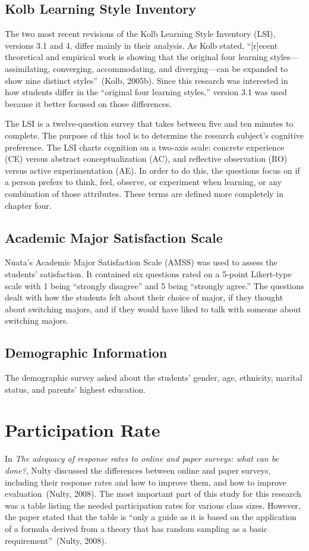 \subsection{Kolb Learning Style Inventory}
The two most recent revisions of the Kolb Learning Style Inventory (LSI), versions 3.1 and 4, differ mainly in their analysis. As Kolb stated, ``[r]ecent theoretical and empirical work is showing that the original four learning styles—assimilating, converging, accommodating, and diverging—can be expanded to show nine distinct styles''~(Kolb, 2005b). Since this research was interested in how students differ in the ``original four learning styles,'' version 3.1 was used because it better focused on those differences.

The LSI is a twelve-question survey that takes between five and ten minutes to complete. The purpose of this tool is to determine the research subject's cognitive preference. The LSI charts cognition on a two-axis scale: concrete experience (CE) versus abstract conceptualization (AC), and reflective observation (RO) versus active experimentation (AE). In order to do this, the questions focus on if a person prefers to think, feel, observe, or experiment when learning, or any combination of those attributes. These terms are defined more completely in chapter four.

\subsection{Academic Major Satisfaction Scale}
Nuata's Academic Major Satisfaction Scale (AMSS) was used to assess the students' satisfaction. It contained six questions rated on a 5-point Likert-type scale with 1 being ``strongly disagree'' and 5 being ``strongly agree.'' The questions dealt with how the students felt about their choice of major, if they thought about switching majors, and if they would have liked to talk with someone about switching majors.

\subsection{Demographic Information}
The demographic survey asked about the students' gender, age, ethnicity, marital status, and parents' highest education.

\section{Participation Rate}
In \textit{The adequacy of response rates to online and paper surveys: what can be done?}, Nulty discussed the differences between online and paper surveys, including their response rates and how to improve them, and how to improve evaluation~(Nulty, 2008). The most important part of this study for this research was a table listing the needed participation rates for various class sizes. However, the paper stated that the table is ``only a guide as it is based on the application of a formula derived from a theory that has random sampling as a basic requirement''~(Nulty, 2008).


